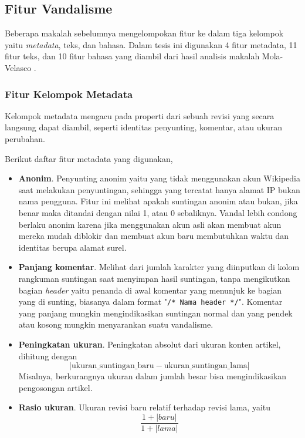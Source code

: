 \subsection{Fitur Vandalisme}

Beberapa makalah sebelumnya mengelompokan fitur ke dalam tiga kelompok yaitu
\textit{metadata}, teks, dan bahasa.
Dalam tesis ini digunakan 4 fitur metadata, 11 fitur teks, dan 10 fitur
bahasa yang diambil dari hasil analisis makalah Mola-Velasco
\cite{mola2012wikipedia}.

\subsubsection{Fitur Kelompok Metadata}

Kelompok metadata mengacu pada properti dari sebuah revisi yang secara langsung
dapat diambil, seperti identitas penyunting, komentar, atau ukuran perubahan.

Berikut daftar fitur metadata yang digunakan,

\begin{itemize}

\item \textbf{Anonim}.
Penyunting anonim yaitu yang tidak menggunakan akun Wikipedia saat melakukan
penyuntingan, sehingga yang tercatat hanya alamat IP bukan nama pengguna.
Fitur ini melihat apakah suntingan anonim atau bukan, jika benar maka ditandai
dengan nilai 1, atau 0 sebaliknya.
Vandal lebih condong berlaku anonim karena jika menggunakan akun asli akan
membuat akun mereka mudah diblokir dan membuat akun baru membutuhkan waktu dan
identitas berupa alamat surel.

\item \textbf{Panjang komentar}.
Melihat dari jumlah karakter yang diinputkan di kolom rangkuman suntingan saat
menyimpan hasil suntingan, tanpa mengikutkan bagian \textit{header} yaitu
penanda di awal komentar yang menunjuk ke bagian yang di sunting, biasanya
dalam format "\texttt{/* Nama header */}".
Komentar yang panjang mungkin mengindikasikan suntingan normal dan yang pendek
atau kosong mungkin menyarankan suatu vandalisme.

\item \textbf{Peningkatan ukuran}.
Peningkatan absolut dari ukuran konten artikel, dihitung dengan
\[
|\text{ukuran\_suntingan\_baru} - \text{ukuran\_suntingan\_lama}|
\]
Misalnya, berkurangnya ukuran dalam jumlah besar bisa mengindikasikan
pengosongan artikel.

\item \textbf{Rasio ukuran}.
Ukuran revisi baru relatif terhadap revisi lama, yaitu
\[
\frac{1 + |baru|}{1 + |lama|}
\]

\end{itemize}


